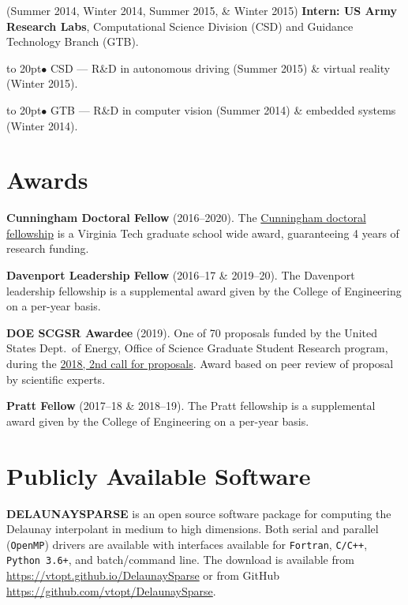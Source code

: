 \documentclass[12pt]{article}
\def\bullitem{\par\hangindent=15pt \hangafter=1
\noindent\hbox to 20pt{\hfil$\bullet$\hfil}\ignorespaces}
\begin{document}
\medskip

\hangindent=0.3in
(Summer 2014, Winter 2014, Summer 2015, \& Winter 2015)
\textbf{Intern: US Army Research Labs}, 
Computational Science Division (CSD) and Guidance Technology Branch (GTB).
\bullitem
CSD --- R\&D in autonomous driving (Summer 2015) \&
virtual reality (Winter 2015).
\bullitem
GTB --- R\&D in computer vision (Summer 2014) \& embedded systems (Winter 2014).

\newpage
\section*{Awards}

\textbf{Cunningham Doctoral Fellow} (2016--2020).
The 
\href{https://graduateschool.vt.edu/funding/types-of-funding/funding-sponsored-by-the-graduate-school/cunningham-doctoral-assistantships.html}
{Cunningham doctoral fellowship} is a Virginia Tech graduate school wide
award, guaranteeing 4 years of research funding.

\textbf{Davenport Leadership Fellow} (2016--17 \& 2019--20).
The Davenport leadership fellowship is a supplemental award given by
the College of Engineering on a per-year basis.

\textbf{DOE SCGSR Awardee} (2019).
One of 70 proposals funded by the United States Dept.\ of Energy,
Office of Science Graduate Student Research program, during the
\href{https://www.energy.gov/articles/doe-s-science-graduate-student-research-program-selects-70-students-pursue-research-doe}{2018, 2nd call for proposals}.
Award based on peer review of proposal by scientific experts.

\textbf{Pratt Fellow} (2017--18 \& 2018--19).
The Pratt fellowship is a supplemental award given by
the College of Engineering on a per-year basis.

\section*{Publicly Available Software}

\textbf{DELAUNAYSPARSE} is an open source software package
for computing the Delaunay interpolant in medium to high dimensions.
Both serial and parallel (\texttt{OpenMP}) drivers are available
with interfaces available for
\texttt{Fortran},
\texttt{C/C++},
\texttt{Python 3.6+},
and batch/command line.
The download is available from \url{https://vtopt.github.io/DelaunaySparse}
or from GitHub \url{https://github.com/vtopt/DelaunaySparse}.
\end{document}
